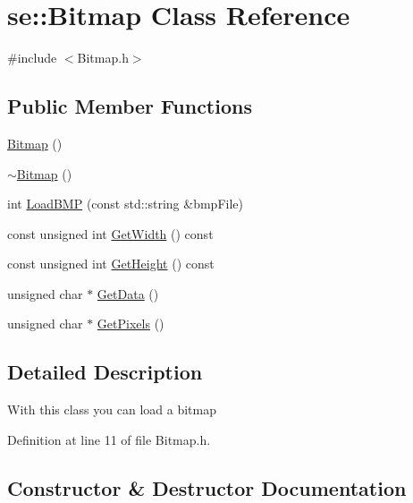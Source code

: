 \hypertarget{classse_1_1_bitmap}{}\section{se\+:\+:Bitmap Class Reference}
\label{classse_1_1_bitmap}


{\ttfamily \#include $<$Bitmap.\+h$>$}

\subsection*{Public Member Functions}
\begin{DoxyCompactItemize}
\item 
\mbox{\hyperlink{classse_1_1_bitmap_a7b43662ae9e5584ee8e3cef244ca32f7}{Bitmap}} ()
\item 
\mbox{\hyperlink{classse_1_1_bitmap_aa098fcae7998e75240e46594fe84996e}{$\sim$\+Bitmap}} ()
\item 
int \mbox{\hyperlink{classse_1_1_bitmap_a76c7fbaf5d2049af44abf83fe40a854d}{Load\+B\+MP}} (const std\+::string \&bmp\+File)
\item 
const unsigned int \mbox{\hyperlink{classse_1_1_bitmap_adff193db6b52af590cad8f7200a83b6c}{Get\+Width}} () const
\item 
const unsigned int \mbox{\hyperlink{classse_1_1_bitmap_a24d34941103efc40b746d16bc4650970}{Get\+Height}} () const
\item 
unsigned char $\ast$ \mbox{\hyperlink{classse_1_1_bitmap_a2467e494eccacc94756c3f02b0d0cc5e}{Get\+Data}} ()
\item 
unsigned char $\ast$ \mbox{\hyperlink{classse_1_1_bitmap_a7e0aa0d86804f241261c46307447a4f5}{Get\+Pixels}} ()
\end{DoxyCompactItemize}


\subsection{Detailed Description}
With this class you can load a bitmap 

Definition at line 11 of file Bitmap.\+h.



\subsection{Constructor \& Destructor Documentation}
\mbox{\label{classse_1_1_bitmap_a7b43662ae9e5584ee8e3cef244ca32f7}} 
